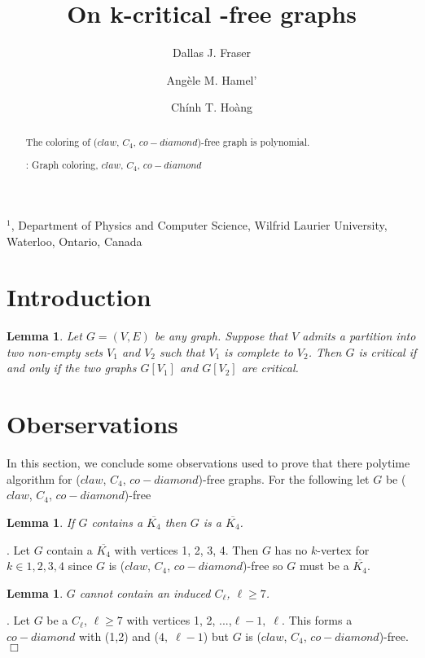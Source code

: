 \documentclass[12pt]{article}
\title{On k-critical {\CCD}-free graphs}
\author{
	Dallas J. Fraser\inst{1}
	\and Ang\`ele M. Hamel'\inst{1}
	\and Ch\'inh T. Ho\`ang\inst{1}
}
\newtheorem{Lemma}[Theorem]{Lemma}
\def\inst#1{$^{#1}$}
\def\CCD{($claw$, $C_4$, $co-diamond$)}
\begin{document}
\maketitle

\begin{center}
{\footnotesize

\inst{1}, Department of Physics and Computer Science, Wilfrid Laurier
University, \\Waterloo, Ontario, Canada}

\end{center}

\begin{abstract}
The coloring of {\CCD}-free graph is polynomial.

: Graph coloring, $claw$, $C_4$, $co-diamond$
\end{abstract}


\section{Introduction}\label{sec:intro}

\begin{Lemma}\label{lem:join-critical}
Let $G=(V,E)$ be any graph.  Suppose that $V$ admits a partition into
two non-empty sets $V_1$ and $V_2$ such that $V_1$ is complete to
$V_2$.  Then $G$ is critical if and only if the two graphs $G[V_1]$
and $G[V_2]$ are critical.
\end{Lemma}

\section{Oberservations}\label{sec:observations}
In this section, we conclude some observations used to prove that there polytime algorithm for {\CCD}-free graphs. For the following let $G$ be {\CCD}-free

\begin{Lemma}\label{lem:cok4-reduce-codiamond}
If $G$ contains a $\overline{K_4}$ then $G$ is a $\overline{K_4}$.
\end{Lemma}
. Let $G$ contain a $\overline{K_4}$ with vertices 1, 2, 3, 4. Then $G$ has no $k$-vertex for $k \in {1,2,3,4}$ since $G$ is {\CCD}-free so $G$ must be a $\overline{K_4}$. 

\begin{Lemma}\label{lem:odd-hole-free}
$G$ cannot contain an induced $C_\ell$, $\ell \geq 7$.
\end{Lemma}
. Let $G$ be a $C_\ell$, $\ell \geq 7$ with vertices 1, 2, ...,$\ell - 1,\; \ell$. This forms a $co-diamond$ with (1,2) and ($4,\; \ell - 1$) but $G$ is {\CCD}-free. $\Box$
\end{document}
